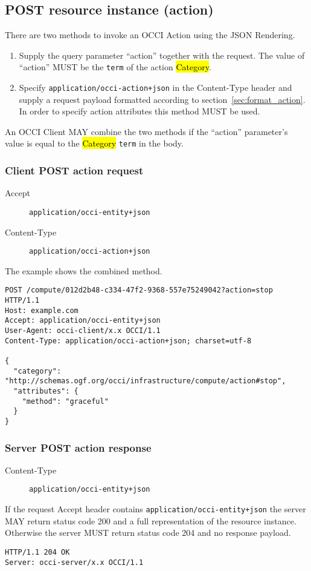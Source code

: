 \documentclass[10pt,a4paper]{article}
\begin{document}
\subsection{POST resource instance (action)}
There are two methods to invoke an OCCI Action using the JSON Rendering.
\begin{enumerate}
\item Supply the query parameter ``action'' together with the request. The value
of ``action'' MUST be the {\tt term} of the action \hl{Category}.
\item Specify {\tt application/occi-action+json} in the Content-Type header
and supply a request payload formatted according to section~\ref{sec:format_action}.
In order to specify action attributes this method MUST be used.
\end{enumerate}
An OCCI Client MAY combine the two methods if the ``action'' parameter's value
is equal to the \hl{Category} {\tt term} in the body.

\subsubsection{Client POST action request}
\begin{description}
\item[Accept] {\tt application/occi-entity+json}
\item[Content-Type] {\tt application/occi-action+json}
\end{description}
The example shows the combined method.
\begin{verbatim}
POST /compute/012d2b48-c334-47f2-9368-557e75249042?action=stop HTTP/1.1
Host: example.com
Accept: application/occi-entity+json
User-Agent: occi-client/x.x OCCI/1.1
Content-Type: application/occi-action+json; charset=utf-8

{
  "category": "http://schemas.ogf.org/occi/infrastructure/compute/action#stop",
  "attributes": {
    "method": "graceful"
  }
}
\end{verbatim}

\subsubsection{Server POST action response}
\begin{description}
\item[Content-Type] {\tt application/occi-entity+json}
\end{description}
If the request Accept header contains {\tt application/occi-entity+json} the
server MAY return status code 200 and a full representation of the resource instance.
Otherwise the server MUST return status code 204 and no response payload.
\begin{verbatim}
HTTP/1.1 204 OK
Server: occi-server/x.x OCCI/1.1
\end{verbatim}
\end{document}
